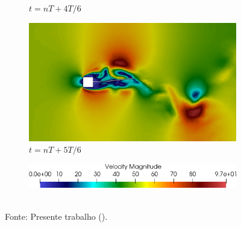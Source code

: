 \begin{figure}[h!]
\begin{subfigure}[b]{0.32\textwidth}
        \caption{$t=nT+4T/6$}
    \end{subfigure}
    \begin{subfigure}[b]{0.32\textwidth}
        \includegraphics[width=\linewidth]{Figuras/FSI-prism2/vT6.png}
        \caption{$t=nT+5T/6$}
    \end{subfigure}
    \begin{subfigure}[b]{0.49\textwidth}
        \includegraphics[width=\linewidth]{Figuras/FSI-prism2/vLegenda.png}
    \end{subfigure}
    \\Fonte: Presente trabalho (\the\year).
    \label{fig:prismVel2}
\end{figure}

